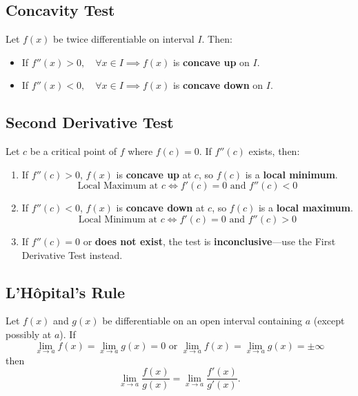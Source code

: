 \documentclass[a4paper,11pt]{article}
\theoremstyle{definition}
\theoremstyle{plain}
\theoremstyle{remark}
\begin{document}


\subsection{Concavity Test}

\begin{tcolorbox}
    Let $f(x)$ be twice differentiable on interval $I$. Then:
    \begin{itemize}
        \item If $f''(x) > 0, \quad \forall x \in I \implies f(x)$ is \textbf{concave up} on $I$.
        \item If $f''(x) < 0, \quad \forall x \in I \implies f(x)$ is \textbf{concave down} on $I$.
    \end{itemize}
\end{tcolorbox}




\subsection{Second Derivative Test}

\begin{tcolorbox}
    Let $c$ be a critical point of $f$ where $f(c)=0$. If $f''(c)$ exists, then:
    \begin{enumerate}
        \item If $f''(c) > 0$, $f(x)$ is \textbf{concave up} at $c$, so $f(c)$ is a \textbf{local minimum}.
        \[ \text{Local Maximum at $c$} \iff f'(c) = 0 \text{ and } f''(c) < 0 \]
        \item If $f''(c) < 0$, $f(x)$ is \textbf{concave down} at $c$, so $f(c)$ is a \textbf{local maximum}.
        \[ \text{Local Minimum at $c$} \iff f'(c) = 0 \text{ and } f''(c) > 0 \]
        \item If $f''(c) = 0$ or \textbf{does not exist}, the test is \textbf{inconclusive}---use the First Derivative Test instead.
    \end{enumerate}
\end{tcolorbox}




\subsection{L'Hôpital's Rule}

\begin{tcolorbox}
    Let $f(x)$ and $g(x)$ be differentiable on an open interval containing $a$ (except possibly at $a$). If 
    \[ 
    \lim_{x \to a} f(x) = \lim_{x \to a} g(x) = 0 \text{ or } \lim_{x \to a} f(x) = \lim_{x \to a} g(x) = \pm \infty 
    \]
    then
    \[
    \lim_{x \to a} \frac{f(x)}{g(x)} = \lim_{x \to a} \frac{f'(x)}{g'(x)}.
    \]
\end{tcolorbox}
\end{document}

